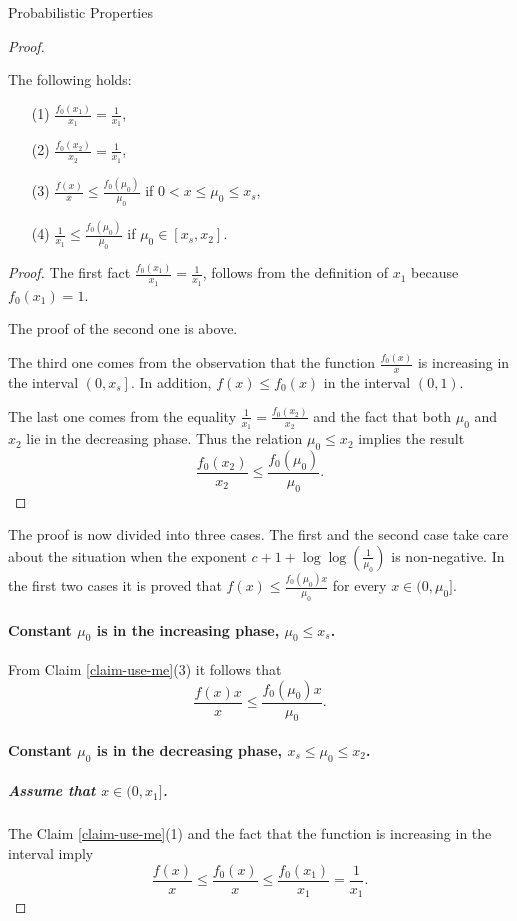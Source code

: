 \begin{section}{Probabilistic Properties}
\begin{proof}
\begin{claim}
\label{claim-use-me}
The following holds:
\begin{enumerate}
\item[(1)] $\frac{f_0(x_1)}{x_1} = \frac{1}{x_1}$,
\item[(2)] $\frac{f_0(x_2)}{x_2} = \frac{1}{x_1}$,
\item[(3)] $\frac{f(x)}{x} \leq \frac{f_0(\mu_0)}{\mu_0}$ if $0 < x \leq \mu_0 \leq x_s$,
\item[(4)] $\frac{1}{x_1} \leq \frac{f_0(\mu_0)}{\mu_0}$ if $\mu_0 \in \left[x_s, x_2 \right]$.
\end{enumerate}
\end{claim}
\begin{proof}
The first fact $\frac{f_0(x_1)}{x_1} = \frac{1}{x_1}$, follows from the definition of $x_1$ because $f_0(x_1) = 1$. 

The proof of the second one is above.

The third one comes from the observation that the function $\frac{f_0(x)}{x}$ is increasing in the interval $\left(0, x_s \right]$. In addition, $f(x) \leq f_0(x)$ in the interval $(0, 1)$.

The last one comes from the equality $\frac{1}{x_1} = \frac{f_0(x_2)}{x_2}$ and the fact that both $\mu_0$ and $x_2$ lie in the decreasing phase. Thus the relation $\mu_0 \leq x_2$ implies the result \[ \frac{f_0(x_2)}{x_2} \leq \frac{f_0(\mu_0)}{\mu_0} \text{.} \]
\end{proof}

The proof is now divided into three cases. The first and the second case take care about the situation when the exponent $c + 1 + \log \log \left(\frac{1}{\mu_0}\right)$ is non-negative. In the first two cases it is proved that $f(x) \leq \frac{f_0(\mu_0)x}{\mu_0}$ for every $x \in (0, \mu_0]$.
\paragraph{Constant $\mu_0$ is in the increasing phase, $\mu_0 \leq x_s$.}
From Claim \ref{claim-use-me}(3) it follows that \[ \frac{f(x)x}{x} \leq \frac{f_0(\mu_0)x}{\mu_0} \text{.} \]

\paragraph{Constant $\mu_0$ is in the decreasing phase, $x_s \leq \mu_0 \leq x_2$.}
\subparagraph{Assume that $x \in (0, x_1]$.} The Claim \ref{claim-use-me}(1) and the fact that the function is increasing in the interval imply
\[
	\frac{f(x)}{x} \leq \frac{f_0(x)}{x} \leq \frac{f_0(x_1)}{x_1} = \frac{1}{x_1} \text{.}
\]


\end{proof}
\end{section}
